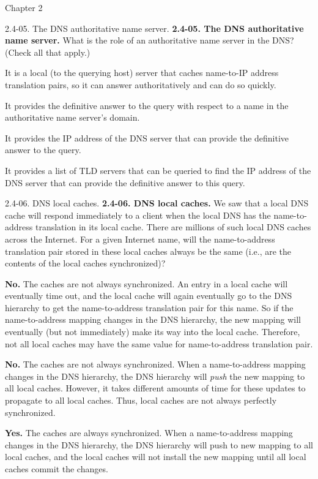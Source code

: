 \documentclass[11pt]{article}
\begin{document}
\begin{quiz}{Chapter 2}
\begin{multi}[points=1,shuffle,multiple]{2.4-05. The DNS authoritative name server.}
\textbf{2.4-05. The DNS authoritative name server.} 
What is the role of an authoritative name server in the DNS? (Check all that apply.)
\item It is a local (to the querying host) server that caches name-to-IP address translation pairs, so it can answer authoritatively and can do so quickly.
\item* It provides the definitive answer to the query with respect to a name in the authoritative name server's domain.
\item It provides the IP address of the DNS server that can provide the definitive answer to the query.
\item It provides a list of TLD servers that can be queried to find the IP address of the DNS server that can provide the definitive answer to this query.
\end{multi}

\begin{multi}[points=1,shuffle]{2.4-06. DNS local caches.}
\textbf{2.4-06. DNS local caches.} 
We saw that a local DNS cache will respond immediately to a client when the local DNS has the name-to-address translation in its local cache. There are millions of such local DNS caches across the Internet. For a given Internet name, will the name-to-address translation pair stored in these local caches always be the same (i.e., are the contents of the local caches synchronized)?

\item* \textbf{No.} The caches are not always synchronized. An entry in a local cache will eventually time out, and the local cache will again eventually go to the DNS hierarchy to get the name-to-address translation pair for this name.  So if the name-to-address mapping changes in the DNS hierarchy, the new mapping will eventually (but not immediately) make its way into the local cache. Therefore, not all local caches may have the same value for name-to-address translation pair.
\item \textbf{No.} The caches are not always synchronized. When a name-to-address mapping changes in the DNS hierarchy, the DNS hierarchy will \emph{push} the new mapping to all local caches.  However,  it takes different amounts of time for these updates to propagate to all local caches. Thus, local caches are not always perfectly synchronized.
\item \textbf{Yes.} The caches are always synchronized.  When a name-to-address mapping changes in the DNS hierarchy, the DNS hierarchy will push to new mapping to all local caches, and the local caches will not install the new mapping until all local caches commit the changes.
\end{multi}


\end{quiz}
\end{document}
